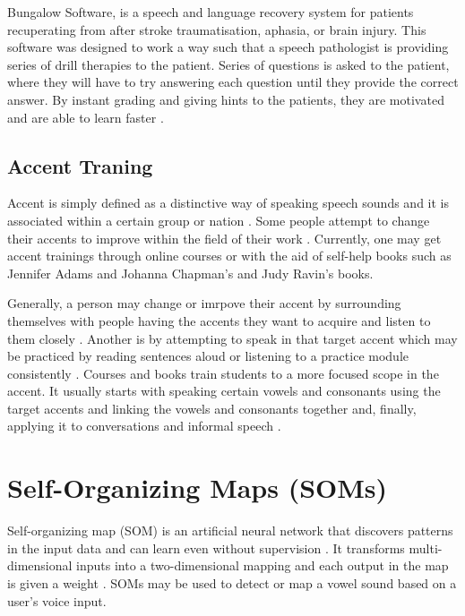 Bungalow Software, is a speech and language recovery system for patients recuperating from after stroke traumatisation, aphasia, or brain injury. This software was designed to work a way such that a speech pathologist is providing series of drill therapies to the patient. Series of questions is asked to the patient, where they will have to try answering each question until they provide the correct answer. By instant grading and giving hints to the patients, they are motivated and are able to learn faster \cite{bungalow:2012:speechtherapy}.

\subsection{Accent Traning}
Accent is simply defined as a distinctive way of speaking speech sounds and it is associated within a certain group or nation \cite{adams:2009:sgsa}. Some people attempt to change their accents to improve within the field of their work \cite{ravin:2004:lyad}. Currently, one may get accent trainings through online courses or with the aid of self-help books such as Jennifer Adams and Johanna Chapman's \citeyear{adams:2009:sgsa} and Judy Ravin's \citeyear{ravin:2004:lyad} books.

Generally, a person may change or imrpove their accent by surrounding themselves with people having the accents they want to acquire and listen to them closely \cite{omniglot:2015:ttiya}. Another is by attempting to speak in that target accent which may be practiced by reading sentences aloud or listening to a practice module consistently \cite{omniglot:2015:ttiya}. Courses and books train students to a more focused scope in the accent. It usually starts with speaking certain vowels and consonants using the target accents and linking the vowels and consonants together and, finally, applying it to conversations and informal speech \cite{ravin:2004:lyad}.


\section{Self-Organizing Maps (SOMs)}
Self-organizing map (SOM) is an artificial neural network that discovers patterns in the input data and can learn even without supervision \cite{kohonen:1988:pho}. It transforms multi-dimensional inputs into a two-dimensional mapping and each output in the map is given a weight \cite{chandar:2013:srs}. SOMs may be used to detect or map a vowel sound based on a user's voice input. 

